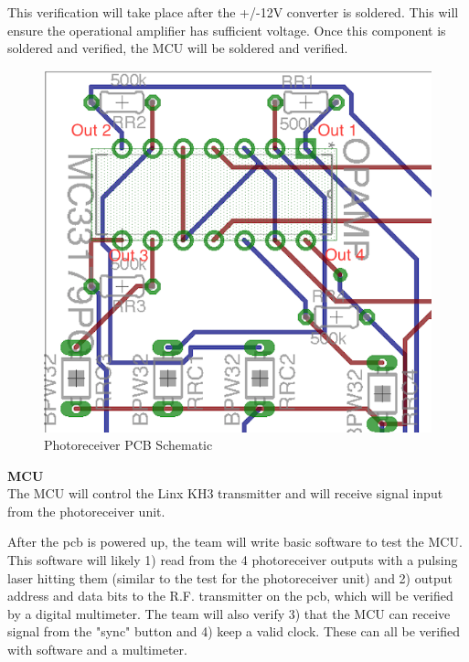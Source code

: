 \documentclass[letterpaper,10pt]{article}
\begin{document}
\begin{spacing}{1.15}
This verification will take place after the +/-12V converter is soldered. This will ensure the operational amplifier has sufficient voltage. Once this component is soldered and verified, the MCU will be soldered and verified. 
\begin{figure} [H]
	\centering
	\includegraphics[scale=1]{photoreceiver-pcb.png}
	\caption{Photoreceiver PCB Schematic\label{fig:photodiode-pcb}}
\end{figure}

\normalsize\textbf{MCU} \\
The MCU will control the Linx KH3 transmitter and will receive signal input from the photoreceiver unit. 

After the pcb is powered up, the team will write basic software to test the MCU. This software will likely 1) read from the 4 photoreceiver outputs with a pulsing laser hitting them (similar to the test for the photoreceiver unit) and 2) output address and data bits to the R.F. transmitter on the pcb, which will be verified by a digital multimeter. The team will also verify 3) that the MCU can receive signal from the "sync" button and 4) keep a valid clock. These can all be verified with software and a multimeter. 


\end{spacing}
\end{document}
